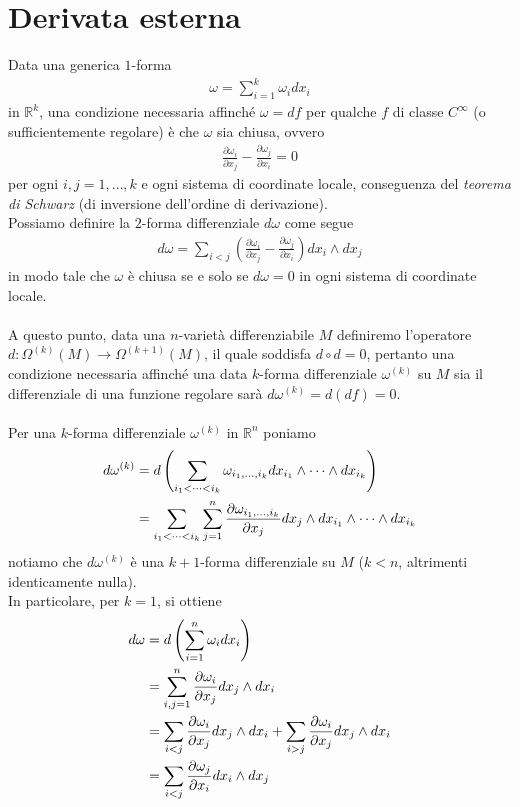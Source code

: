 \documentclass[oneside, 11pt]{amsbook}
\newcommand{\0}{{(0)}}
\newcommand{\3}{{(3)}}
\theoremstyle{colonplain}
\theoremstyle{colondefinition}
\theoremstyle{colonremark}
\numberwithin{equation}{chapter}
\begin{document}
\section{Derivata esterna}
Data una generica $1$-forma 
\begin{align}
    \omega = \sum_{i = 1}^k \omega_i dx_i
\end{align}
in $\mathbb{R}^k$, una condizione necessaria affinché $\omega = df$ per qualche $f$ di classe $C^\infty$ (o sufficientemente regolare) è che $\omega$ sia chiusa, ovvero
\begin{align}
    \frac{\partial \omega_i}{\partial x_j} - \frac{\partial \omega_j}{\partial x_i} = 0
\end{align}
per ogni $i, j = 1, \dots, k$ e ogni sistema di coordinate locale, conseguenza del \textit{teorema di Schwarz} (di inversione dell'ordine di derivazione). \\
Possiamo definire la $2$-forma differenziale $d\omega$ come segue
\begin{align}
    d\omega = \sum_{i < j} \left(\frac{\partial \omega_i}{\partial x_j} - \frac{\partial \omega_j}{\partial x_i}\right)dx_i \wedge dx_j
\end{align}
in modo tale che $\omega$ è chiusa se e solo se $d\omega = 0$ in ogni sistema di coordinate locale. \\ \\
A questo punto, data una $n$-varietà differenziabile $M$ definiremo l'operatore $d : \Omega^{(k)}(M) \longrightarrow \Omega^{(k + 1)}(M)$, il quale soddisfa $d \circ d = 0$, pertanto una condizione necessaria affinché una data $k$-forma differenziale $\omega^{(k)}$ su $M$ sia il differenziale di una funzione regolare sarà $d\omega^{(k)} = d(df) = 0$. \\ \\
Per una $k$-forma differenziale $\omega^{(k)}$ in $\mathbb{R}^n$ poniamo
\begin{align}\label{ExtDiffInR^n}
    d\omega^{(k)} &= d\left(\sum_{i_1 < \dots < i_k} \omega_{i_1, \dots, i_k}dx_{i_1} \wedge \dots \wedge dx_{i_k}\right) \notag \\
    &= \sum_{i_1 < \dots < i_k}\sum_{j = 1}^n \frac{\partial \omega_{i_1, \dots, i_k}}{\partial x_j}dx_j \wedge dx_{i_1} \wedge \dots \wedge dx_{i_k}
\end{align}
notiamo che $d\omega^{(k)}$ è una $k + 1$-forma differenziale su $M$ ($k < n$, altrimenti identicamente nulla). \\
In particolare, per $k = 1$, si ottiene
\begin{align}
    d\omega &= d\left(\sum_{i = 1}^n \omega_i dx_i\right) \notag \\
    &= \sum_{i, j = 1}^n \frac{\partial \omega_i}{\partial x_j}dx_j \wedge dx_i \notag \\
    &= \sum_{i < j}\frac{\partial \omega_i}{\partial x_j}dx_j \wedge dx_i + \sum_{i > j}\frac{\partial \omega_i}{\partial x_j}dx_j \wedge dx_i \notag \\
    &= \sum_{i < j}\frac{\partial \omega_j}{\partial x_i}dx_i \wedge dx_j
\end{align}
\end{document}

